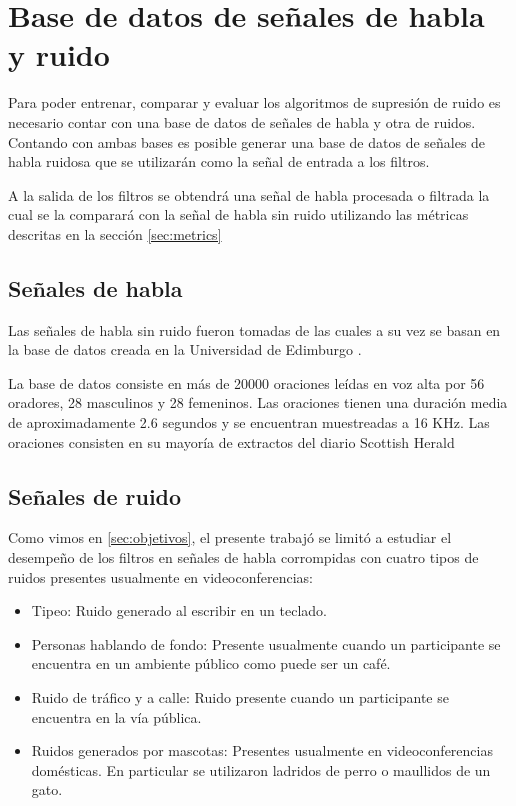 \section{Base de datos de señales de habla y ruido}
\label{sec:audio_db}

Para poder entrenar, comparar y evaluar los algoritmos de supresión de ruido es necesario contar con una base de datos de señales de habla y otra de ruidos. Contando con ambas bases es posible generar una base de datos de señales de habla ruidosa que se utilizarán como la señal de entrada a los filtros.

A la salida de los filtros se obtendrá una señal de habla procesada o filtrada la cual se la comparará con la señal de habla sin ruido utilizando las métricas descritas en la sección \ref{sec:metrics}

\subsection{Señales de habla}

Las señales de habla sin ruido fueron tomadas de \cite{a_scalable_noisy_speech_dataset_and_online_subjective_test_framework} las cuales a su vez se basan en la base de datos creada en la Universidad de Edimburgo \cite{the_voice_bank_corpus}. 

La base de datos consiste en más de 20000 oraciones leídas en voz alta por 56 oradores, 28 masculinos y 28 femeninos. Las oraciones tienen una duración media de aproximadamente 2.6 segundos y se encuentran muestreadas a 16 KHz. Las oraciones consisten en su mayoría de extractos del diario Scottish Herald

\subsection{Señales de ruido}

Como vimos en \ref{sec:objetivos}, el presente trabajó se limitó a estudiar el desempeño de los filtros en señales de habla corrompidas con cuatro tipos de  ruidos presentes usualmente en videoconferencias:

\begin{itemize}
	\item Tipeo: Ruido generado al escribir en un teclado.
	\item Personas hablando de fondo: Presente usualmente cuando un participante se encuentra en un ambiente público como puede ser un café.
	\item Ruido de tráfico y a calle: Ruido presente cuando un participante se encuentra en la vía pública.
	\item Ruidos generados por mascotas: Presentes usualmente en videoconferencias domésticas. En particular se utilizaron ladridos de perro o maullidos de un gato.
\end{itemize}

